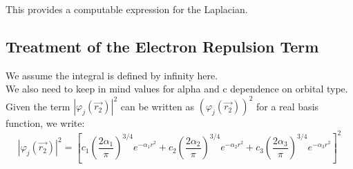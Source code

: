 \documentclass{article}
\begin{document}
This provides a computable  expression for the Laplacian.

\subsection{Treatment of the Electron Repulsion Term}
We assume the integral is defined by infinity here.\\
We also need to keep in mind values for alpha and c dependence  on orbital type. \\
Given the term \( |\varphi_j(\vec{r_2})|^2\) can be written as \( (\varphi_j(\vec{r_2}))^2\) for a real basis function, we write: 
\[|\varphi_j(\vec{r_2})|^2 = \left[ c_1  \left( \frac{2\alpha_1}{\pi} \right)^{3/4} e^{-\alpha_1 r^2} + c_2 \left( \frac{2\alpha_2}{\pi} \right)^{3/4} e^{-\alpha_2 r^2} + c_3 \left( \frac{2\alpha_3}{\pi} \right)^{3/4} e^{-\alpha_3 r^2} \right] ^2\]
\end{document}
